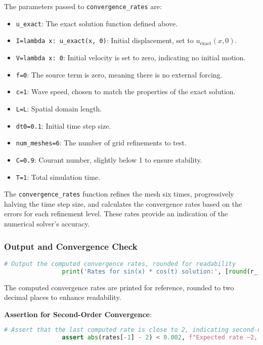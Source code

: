 \documentclass{article}
\begin{document}
			The parameters passed to \texttt{convergence\_rates} are:
			\begin{itemize}
				\item \texttt{u\_exact}: The exact solution function defined above.
				\item \texttt{I=lambda x: u\_exact(x, 0)}: Initial displacement, set to \( u_{\text{exact}}(x, 0) \).
				\item \texttt{V=lambda x: 0}: Initial velocity is set to zero, indicating no initial motion.
				\item \texttt{f=0}: The source term is zero, meaning there is no external forcing.
				\item \texttt{c=1}: Wave speed, chosen to match the properties of the exact solution.
				\item \texttt{L=L}: Spatial domain length.
				\item \texttt{dt0=0.1}: Initial time step size.
				\item \texttt{num\_meshes=6}: The number of grid refinements to test.
				\item \texttt{C=0.9}: Courant number, slightly below 1 to ensure stability.
				\item \texttt{T=1}: Total simulation time.
			\end{itemize}
			
			The \texttt{convergence\_rates} function refines the mesh six times, progressively halving the time step size, and calculates the convergence rates based on the errors for each refinement level. These rates provide an indication of the numerical solver’s accuracy.
			
			\subsubsection{Output and Convergence Check}
			
			\begin{lstlisting}[language=Python]
				# Output the computed convergence rates, rounded for readability
				print('Rates for sin(x) * cos(t) solution:', [round(r_, 2) for r_ in rates])
			\end{lstlisting}
			
			The computed convergence rates are printed for reference, rounded to two decimal places to enhance readability.
			
			\textbf{Assertion for Second-Order Convergence}:
			\begin{lstlisting}[language=Python]
				# Assert that the last computed rate is close to 2, indicating second-order accuracy
				assert abs(rates[-1] - 2) < 0.002, f"Expected rate ~2, but got {rates[-1]}"
			\end{lstlisting}
			
\end{document}
